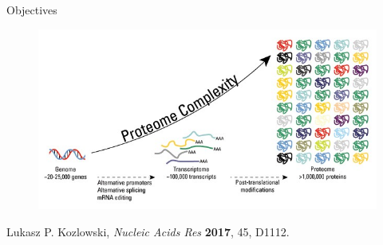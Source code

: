 \documentclass{beamer}
\begin{document}
\begin{frame}{Objectives}
\vspace{-.5cm}
\begin{figure}
	\includegraphics[width=\linewidth]{Pics/proteome}
\end{figure}

\vspace{.5cm}
\hfill {\tiny Lukasz P. Kozlowski, \emph{Nucleic Acids Res} \textbf{2017}, 45, D1112.}
\end{frame}

\end{document}
